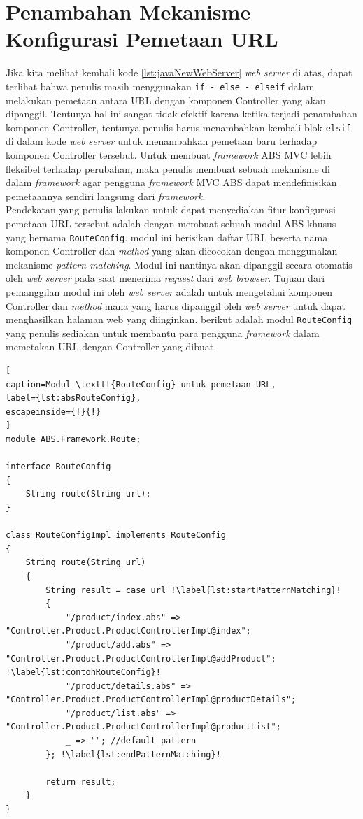 \section{Penambahan Mekanisme Konfigurasi Pemetaan URL}

Jika kita melihat kembali kode \ref{lst:javaNewWebServer} \textit{web server} di atas, dapat terlihat bahwa penulis masih menggunakan \texttt{if - else - elseif} dalam melakukan pemetaan antara URL dengan komponen Controller yang akan dipanggil. Tentunya hal ini sangat tidak efektif karena ketika terjadi penambahan komponen Controller, tentunya penulis harus menambahkan kembali blok \texttt{elsif} di dalam kode \textit{web server} untuk menambahkan pemetaan baru terhadap komponen Controller tersebut. Untuk membuat \textit{framework} ABS MVC lebih fleksibel terhadap perubahan, maka penulis membuat sebuah mekanisme di dalam \textit{framework} agar pengguna \textit{framework} MVC ABS dapat mendefinisikan pemetaannya sendiri langsung dari \textit{framework}.\\

Pendekatan yang penulis lakukan untuk dapat menyediakan fitur konfigurasi pemetaan URL tersebut adalah dengan membuat sebuah modul ABS khusus yang bernama \texttt{RouteConfig}. modul ini berisikan daftar URL beserta nama komponen Controller dan \textit{method} yang akan dicocokan dengan menggunakan mekanisme \textit{pattern matching}. Modul ini nantinya akan dipanggil secara otomatis oleh \textit{web server} pada saat menerima \textit{request} dari \textit{web browser}. Tujuan dari pemanggilan modul ini oleh \textit{web server} adalah untuk mengetahui komponen Controller dan \textit{method} mana yang harus dipanggil oleh \textit{web server} untuk dapat menghasilkan halaman web yang diinginkan. berikut adalah modul \texttt{RouteConfig} yang penulis sediakan untuk membantu para pengguna \textit{framework} dalam memetakan URL dengan Controller yang dibuat.

\begin{lstlisting}[
caption=Modul \texttt{RouteConfig} untuk pemetaan URL,
label={lst:absRouteConfig},
escapeinside={!}{!}
]
module ABS.Framework.Route;

interface RouteConfig
{
	String route(String url);
}

class RouteConfigImpl implements RouteConfig
{
	String route(String url)
	{
		String result = case url !\label{lst:startPatternMatching}!
		{
			"/product/index.abs" => "Controller.Product.ProductControllerImpl@index";
			"/product/add.abs" => "Controller.Product.ProductControllerImpl@addProduct"; !\label{lst:contohRouteConfig}!
			"/product/details.abs" => "Controller.Product.ProductControllerImpl@productDetails";
			"/product/list.abs" => "Controller.Product.ProductControllerImpl@productList";
			_ => ""; //default pattern
		}; !\label{lst:endPatternMatching}!
		
		return result;
	}
}
\end{lstlisting}

